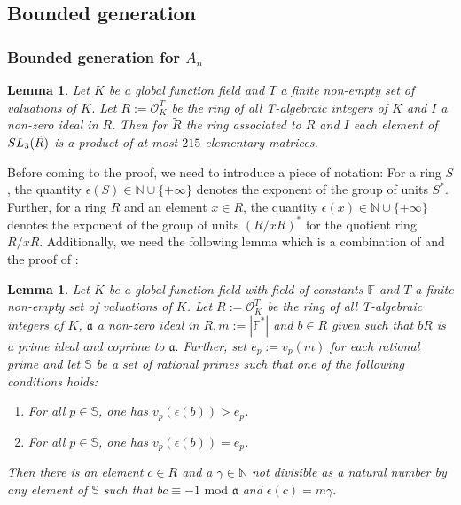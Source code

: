 \documentclass[12pt]{amsart}
\newtheorem{lemma}[theorem]{Lemma}
\theoremstyle{definition}\newtheorem{definition}[theorem]{Definition}
\theoremstyle{remark}\newtheorem{remark}[theorem]{Remark}
\theoremstyle{definition}\newtheorem{case}{Case}
\begin{document}
\subsection{Bounded generation}

\subsubsection{Bounded generation for $A_n$}\label{bounded_generation_subsection_A2}

\begin{lemma}\label{tilde_bounded_generation_A2}
Let $K$ be a global function field and $T$ a finite non-empty set of valuations of $K$. Let $R:=\mathscr{O}_K^T$ be the ring of all T-algebraic integers of $K$ and $I$ a non-zero ideal in $R.$ Then for $\tilde{R}$ the ring associated to $R$ and $I$ each element of ${\rm SL}_3(\tilde{R})$ is a product of at most $215$ elementary matrices. 
\end{lemma}

Before coming to the proof, we need to introduce a piece of notation: For a ring $S$, the quantity $\epsilon(S)\in\mathbb{N}\cup\{+\infty\}$ denotes the exponent of the group of units $S^*$. Further, for a ring $R$ and an element $x\in R$, the quantity $\epsilon(x)\in\mathbb{N}\cup\{+\infty\}$ denotes the exponent of the group of units $(R/xR)^*$ for the quotient ring $R/xR.$ Additionally, we need the following lemma which is a combination of \cite[Lemma~4.3]{gvozdevsky2023width} and the proof of \cite[Lemma~3.3]{https://doi.org/10.1112/blms.12925}: 

\begin{lemma}\label{gcd_lemma_double}
Let $K$ be a global function field with field of constants $\mathbb{F}$ and $T$ a finite non-empty set of valuations of $K$. Let $R:=\mathscr{O}_K^T$ be the ring of all T-algebraic integers of $K$, $\mathfrak{a}$ a non-zero ideal in $R, m:=|\mathbb{F}^*|$ and $b\in R$ given such that $bR$ is a prime ideal and coprime to $\mathfrak{a}.$ Further, set $e_p:=v_p(m)$ for each rational prime and let $\mathbb{S}$ be a set of rational primes such that one of the following conditions holds:
\begin{enumerate}
\item For all $p\in\mathbb{S}$, one has $v_p(\epsilon(b))>e_p$. 
\item For all $p\in\mathbb{S}$, one has $v_p(\epsilon(b))=e_p$. 
\end{enumerate}
Then there is an element $c\in R$ and a $\gamma\in\mathbb{N}$ not divisible as a natural number by any element of $\mathbb{S}$ such that $bc\equiv -1\text{ mod }\mathfrak{a}$ and $\epsilon(c)=m\gamma.$
\end{lemma}
\end{document}

